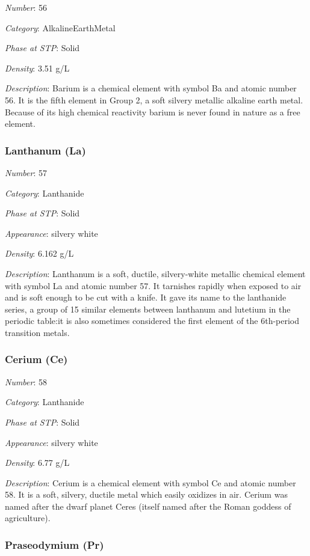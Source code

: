 \documentclass{article}
\begin{document}
\textit{Number}: 56

\textit{Category}: AlkalineEarthMetal

\textit{Phase at STP}: Solid

\textit{Density}: 3.51 g/L

\textit{Description}: Barium is a chemical element with symbol Ba and atomic number 56. It is the fifth element in Group 2, a soft silvery metallic alkaline earth metal. Because of its high chemical reactivity barium is never found in nature as a free element.

\hypertarget{subsubsection::La}{}\subsubsection{Lanthanum (La)}

\textit{Number}: 57

\textit{Category}: Lanthanide

\textit{Phase at STP}: Solid

\textit{Appearance}: silvery white

\textit{Density}: 6.162 g/L

\textit{Description}: Lanthanum is a soft, ductile, silvery-white metallic chemical element with symbol La and atomic number 57. It tarnishes rapidly when exposed to air and is soft enough to be cut with a knife. It gave its name to the lanthanide series, a group of 15 similar elements between lanthanum and lutetium in the periodic table:it is also sometimes considered the first element of the 6th-period transition metals.

\hypertarget{subsubsection::Ce}{}\subsubsection{Cerium (Ce)}

\textit{Number}: 58

\textit{Category}: Lanthanide

\textit{Phase at STP}: Solid

\textit{Appearance}: silvery white

\textit{Density}: 6.77 g/L

\textit{Description}: Cerium is a chemical element with symbol Ce and atomic number 58. It is a soft, silvery, ductile metal which easily oxidizes in air. Cerium was named after the dwarf planet Ceres (itself named after the Roman goddess of agriculture).

\hypertarget{subsubsection::Pr}{}\subsubsection{Praseodymium (Pr)}
\end{document}
